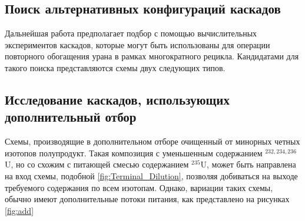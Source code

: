 \subsection{Поиск альтернативных конфигураций каскадов}
Дальнейшая работа предполагает подбор с помощью вычислительных экспериментов каскадов, которые могут быть использованы для операции повторного обогащения урана в рамках многократного рецикла. Кандидатами для такого поиска представляются схемы двух следующих типов.

\subsection{Исследование каскадов, использующих дополнительный отбор}
Схемы, производящие в дополнительном отборе очищенный от минорных четных изотопов полупродукт. Такая композиция с уменьшенным содержанием $^{232,234,236}$U, но со схожим с питающей смесью содержанием $^{235}$U, может быть направлена на вход схемы, подобной \ref{fig:Terminal_Dilution}, позволяя добиваться на выходе требуемого содержания по всем изотопам. Однако,  вариации таких схемы, обычно имеют дополнительные потоки питания, как представлено на рисунках \ref{fig:add}

